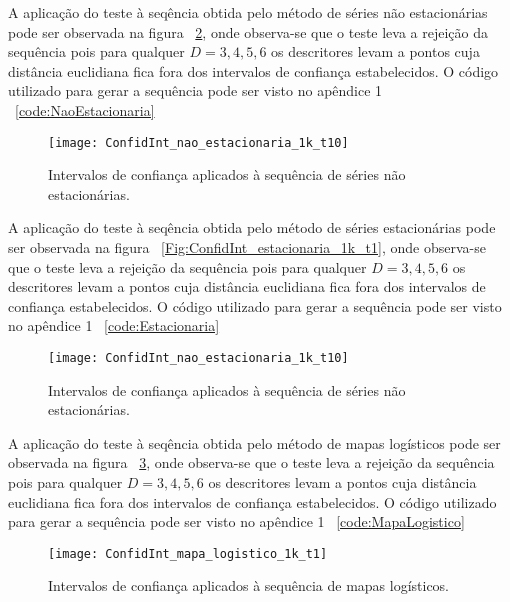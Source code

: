 A aplicação do teste à seqência obtida pelo método de séries não estacionárias pode ser observada na figura ~\ref{Fig:ConfidInt_nao_estacionaria_1k_t10}, onde observa-se que o teste leva a rejeição da sequência pois para qualquer $D= 3, 4, 5, 6$ os descritores levam a pontos cuja distância euclidiana fica fora dos intervalos de confiança estabelecidos. O código utilizado para gerar a sequência pode ser visto no apêndice 1 ~\ref{code:NaoEstacionaria}

\begin{figure}
	\centering
	\texttt{[image: ConfidInt\_nao\_estacionaria\_1k\_t10]}
	\caption{Intervalos de confiança aplicados à sequência de séries não estacionárias.}\label{Fig:ConfidInt_nao_estacionaria_1k_t10}
\end{figure}
%
A aplicação do teste à seqência obtida pelo método de séries estacionárias pode ser observada na figura ~\ref{Fig:ConfidInt_estacionaria_1k_t1}, onde observa-se que o teste leva a rejeição da sequência pois para qualquer $D= 3, 4, 5, 6$ os descritores levam a pontos cuja distância euclidiana fica fora dos intervalos de confiança estabelecidos. O código utilizado para gerar a sequência pode ser visto no apêndice 1 ~\ref{code:Estacionaria}

\begin{figure}
	\centering
	\texttt{[image: ConfidInt\_nao\_estacionaria\_1k\_t10]}
	\caption{Intervalos de confiança aplicados à sequência de séries não estacionárias.}\label{Fig:ConfidInt_nao_estacionaria_1k_t10}
\end{figure}
%
A aplicação do teste à seqência obtida pelo método de mapas logísticos pode ser observada na figura ~\ref{Fig:ConfidInt_mapa_logistico_1k_t1}, onde observa-se que o teste leva a rejeição da sequência pois para qualquer $D= 3, 4, 5, 6$ os descritores levam a pontos cuja distância euclidiana fica fora dos intervalos de confiança estabelecidos. O código utilizado para gerar a sequência pode ser visto no apêndice 1 ~\ref{code:MapaLogistico}

\begin{figure}
	\centering
	\texttt{[image: ConfidInt\_mapa\_logistico\_1k\_t1]}
	\caption{Intervalos de confiança aplicados à sequência de mapas logísticos.}\label{Fig:ConfidInt_mapa_logistico_1k_t1}
\end{figure}